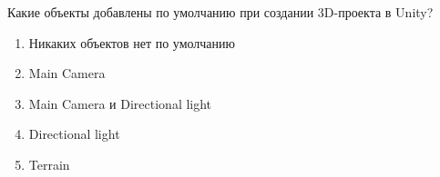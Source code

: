 
Какие объекты добавлены по умолчанию при создании 3D-проекта в Unity?

\begin{enumerate}
    \item Никаких объектов нет по умолчанию
    \item Main Camera
    \item Main Camera и Directional light
    \item Directional light
    \item Terrain
\end{enumerate}

